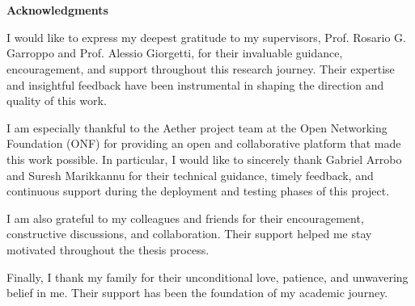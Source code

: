 \chapter*{}
\begin{center}
  \Large\textbf{Acknowledgments}
\end{center}
I would like to express my deepest gratitude to my supervisors, Prof. Rosario G. Garroppo and Prof. Alessio Giorgetti, for their invaluable guidance, encouragement, and support throughout this research journey. Their expertise and insightful feedback have been instrumental in shaping the direction and quality of this work.

I am especially thankful to the Aether project team at the Open Networking Foundation (ONF) for providing an open and collaborative platform that made this work possible. In particular, I would like to sincerely thank Gabriel Arrobo and Suresh Marikkannu for their technical guidance, timely feedback, and continuous support during the deployment and testing phases of this project.

I am also grateful to my colleagues and friends for their encouragement, constructive discussions, and collaboration. Their support helped me stay motivated throughout the thesis process.

Finally, I thank my family for their unconditional love, patience, and unwavering belief in me. Their support has been the foundation of my academic journey.

